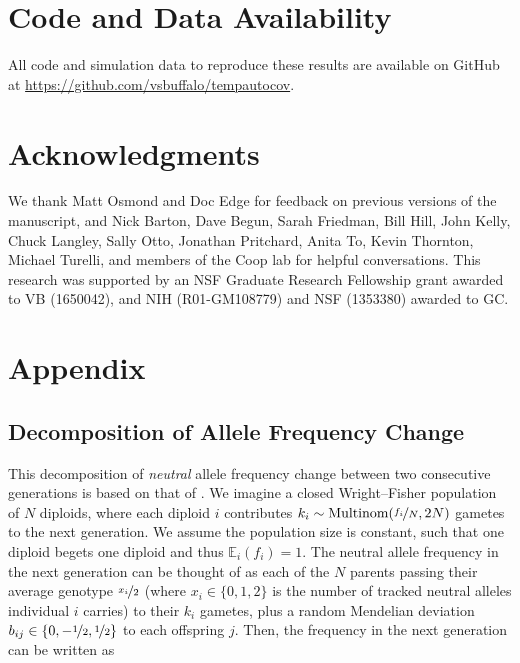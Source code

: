 \documentclass[11pt]{article}
\newcommand{\E}{\mathbb{E}}
\begin{document}
\section{Code and Data Availability}

All code and simulation data to reproduce these results are available on GitHub
at \url{https://github.com/vsbuffalo/tempautocov}.

\section{Acknowledgments}

We thank Matt Osmond and Doc Edge for feedback on previous versions of the
manuscript, and Nick Barton, Dave Begun, Sarah Friedman, Bill Hill, John Kelly,
Chuck Langley, Sally Otto, Jonathan Pritchard, Anita To, Kevin Thornton,
Michael Turelli, and members of the Coop lab for helpful conversations. This
research was supported by an NSF Graduate Research Fellowship grant awarded to
VB (1650042), and NIH (R01-GM108779) and NSF (1353380) awarded to GC.

\printbibliography


\newpage


\appendix

\section{Appendix} 

\subsection{Decomposition of Allele Frequency Change}
\label{ap:decomp}

This decomposition of \emph{neutral} allele frequency change between two
consecutive generations is based on that of \textcite{Santiago1995-hx}. We
imagine a closed Wright--Fisher population of $N$ diploids, where each diploid
$i$ contributes $k_i \sim \text{Multinom}(\nicefrac{f_i}{N}, 2N)$ gametes to
the next generation. We assume the population size is constant, such that one
diploid begets one diploid and thus $\E_i(f_i) = 1$. The neutral allele
frequency in the next generation can be thought of as each of the $N$ parents
passing their average genotype $\nicefrac{x_i}{2}$ (where $x_i \in\{0, 1, 2\}$
is the number of tracked neutral alleles individual $i$ carries) to their $k_i$
gametes, plus a random Mendelian deviation $b_{ij} \in \{0, -\nicefrac{1}{2},
\nicefrac{1}{2}\}$ to each offspring $j$. Then, the frequency in the next
generation can be written as
\end{document}

